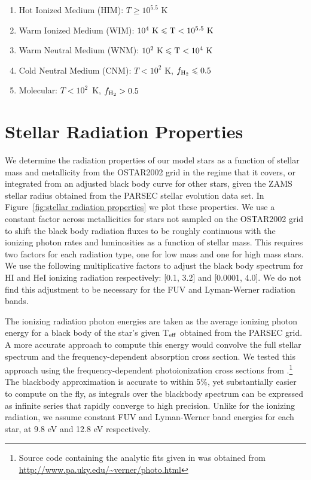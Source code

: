\documentclass[fleqn,usenatbib,useAMS]{mnras}
\begin{document}
\begin{enumerate}
\item Hot Ionized Medium (HIM): $T \geq 10^{5.5}$ K
\item Warm Ionized Medium (WIM): $10^{4}~\rm{K} \leq T < 10^{5.5}~\rm{K} $
\item Warm Neutral Medium (WNM): $10^{2}~\rm{K} \leq T < 10^{4}~ \rm{K}$
\item Cold Neutral Medium (CNM): $T < 10^2$ K, $f_{\rm H_2} \leq 0.5$
\item Molecular: $T < 10^2$~K, $f_{\rm H_2} > 0.5$
\end{enumerate}

\section{Stellar Radiation Properties}
\label{appendix:radiation}
We determine the radiation properties of our model stars as a function of stellar mass and metallicity from the OSTAR2002 grid \citep{Lanz2003} in the regime that it covers, or integrated from an adjusted black body curve for other stars, given the ZAMS stellar radius obtained from the PARSEC \citep{Bressan2012,Tang2014} stellar evolution data set. In Figure~\ref{fig:stellar radiation properties} we plot these properties. We use a constant factor across metallicities for stars not sampled on the OSTAR2002 grid to shift the black body radiation fluxes to be roughly continuous with the ionizing photon rates and luminosities as a function of stellar mass. This requires two factors for each radiation type, one for low mass and one for high mass stars. We use the following multiplicative factors to adjust the black body spectrum for HI and HeI ionizing radiation respectively: [0.1, 3.2] and [0.0001, 4.0]. We do not find this adjustment to be necessary for the FUV and Lyman-Werner radiation bands.

The ionizing radiation photon energies are taken as the average ionizing photon energy for a black body of the star's given T$_{\rm eff}$ obtained from the PARSEC grid. A more accurate approach to compute this energy would convolve the full stellar spectrum and the frequency-dependent absorption cross section. We tested this approach using the frequency-dependent photoionization cross sections from \citet{1996ApJ...465..487V}.\footnote{Source code containing the analytic fits given in \citet{1996ApJ...465..487V} was obtained from \url{http://www.pa.uky.edu/~verner/photo.html}} 
The blackbody approximation is accurate to within 5\%, yet substantially easier to compute on the fly, as integrals over the blackbody spectrum can be expressed as infinite series that rapidly converge to high precision. Unlike for the ionizing radiation, we assume constant FUV and Lyman-Werner band energies for each star, at 9.8 eV and 12.8 eV respectively.
\end{document}
